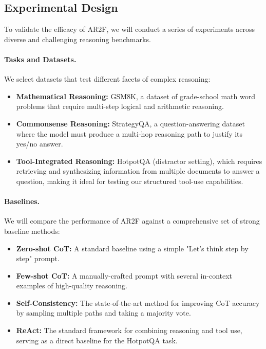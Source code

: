 \documentclass{article}
\begin{document}
\subsection{Experimental Design}
To validate the efficacy of AR2F, we will conduct a series of experiments across diverse and challenging reasoning benchmarks.

\paragraph{Tasks and Datasets.} We select datasets that test different facets of complex reasoning:
\begin{itemize}
    \item \textbf{Mathematical Reasoning:} GSM8K, a dataset of grade-school math word problems that require multi-step logical and arithmetic reasoning.
    \item \textbf{Commonsense Reasoning:} StrategyQA, a question-answering dataset where the model must produce a multi-hop reasoning path to justify its yes/no answer.
    \item \textbf{Tool-Integrated Reasoning:} HotpotQA (distractor setting), which requires retrieving and synthesizing information from multiple documents to answer a question, making it ideal for testing our structured tool-use capabilities.
\end{itemize}

\paragraph{Baselines.} We will compare the performance of AR2F against a comprehensive set of strong baseline methods:
\begin{itemize}
    \item \textbf{Zero-shot CoT:} A standard baseline using a simple "Let's think step by step" prompt.
    \item \textbf{Few-shot CoT:} A manually-crafted prompt with several in-context examples of high-quality reasoning.
    \item \textbf{Self-Consistency:} The state-of-the-art method for improving CoT accuracy by sampling multiple paths and taking a majority vote.
    \item \textbf{ReAct:} The standard framework for combining reasoning and tool use, serving as a direct baseline for the HotpotQA task.
\end{itemize}
\end{document}
